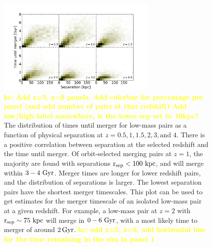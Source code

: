 \documentclass[twocolumn,linenumbers]{aastex631}
\newcommand{\kc}[1]{\textcolor{yellow}{\textbf{kc: #1}} }
\begin{document}
\begin{figure}[htb]
    \begin{center}
    \includegraphics[width=0.7\textwidth]{plots/bet-on-it/3_Timevsseplow-2d.png}
    \caption{\kc{Add z=5, z=6 panels. Add colorbar for percentage per panel (and add number of pairs at that redshift) Add low/high label somewhere, is the lower sep set to 10kpc?} The distribution of times until merger for low-mass pairs as a function of physical separation at $z=0.5,1,1.5,2,3,\mbox{and }4$. 
    There is a positive correlation between separation at the selected redshift and the time until merger. 
    Of orbit-selected merging pairs at $z=1$, the majority are found with separations $\rm r_{sep}<100\,\mathrm{\,kpc}$, and will merge within $3-4\, \mathrm{\,Gyr}$. 
    Merger times are longer for lower redshift pairs, and the distribution of separations is larger.
    The lowest separation pairs have the shortest merger timescales.
    This plot can be used to get estimates for the merger timescale of an isolated low-mass pair at a given redshift. For example, a low-mass pair at $z=2$ with $\rm r_{sep}\sim 75\,\mathrm{\,kpc}$ will merge in $0-6\,\mathrm{\,Gyr}$, with a most likely time to merger of around $2\mathrm{\,Gyr}$.
    \kc{add z=5, z=6, add horizontal line for the time remaining in the sim in panel 1}
    }
    \label{fig:timevssep-low}
    \end{center}
\end{figure}
\end{document}
